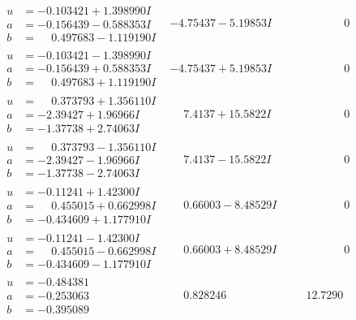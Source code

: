 \documentclass[1p]{elsarticle_modified}
\theoremstyle{definition}
\begin{document}
$$\begin{array}{c|c|c}
\begin{aligned}
u &= -0.103421 + 1.398990 I \\
a &= -0.156439 - 0.588353 I \\
b &= \phantom{-}0.497683 - 1.119190 I\end{aligned}
 & -4.75437 - 5.19853 I & \phantom{-0.000000 } 0 \\ \hline\begin{aligned}
u &= -0.103421 - 1.398990 I \\
a &= -0.156439 + 0.588353 I \\
b &= \phantom{-}0.497683 + 1.119190 I\end{aligned}
 & -4.75437 + 5.19853 I & \phantom{-0.000000 } 0 \\ \hline\begin{aligned}
u &= \phantom{-}0.373793 + 1.356110 I \\
a &= -2.39427 + 1.96966 I \\
b &= -1.37738 + 2.74063 I\end{aligned}
 & \phantom{-}7.4137 + 15.5822 I & \phantom{-0.000000 } 0 \\ \hline\begin{aligned}
u &= \phantom{-}0.373793 - 1.356110 I \\
a &= -2.39427 - 1.96966 I \\
b &= -1.37738 - 2.74063 I\end{aligned}
 & \phantom{-}7.4137 - 15.5822 I & \phantom{-0.000000 } 0 \\ \hline\begin{aligned}
u &= -0.11241 + 1.42300 I \\
a &= \phantom{-}0.455015 + 0.662998 I \\
b &= -0.434609 + 1.177910 I\end{aligned}
 & \phantom{-}0.66003 - 8.48529 I & \phantom{-0.000000 } 0 \\ \hline\begin{aligned}
u &= -0.11241 - 1.42300 I \\
a &= \phantom{-}0.455015 - 0.662998 I \\
b &= -0.434609 - 1.177910 I\end{aligned}
 & \phantom{-}0.66003 + 8.48529 I & \phantom{-0.000000 } 0 \\ \hline\begin{aligned}
u &= -0.484381\phantom{ +0.000000I} \\
a &= -0.253063\phantom{ +0.000000I} \\
b &= -0.395089\phantom{ +0.000000I}\end{aligned}
 & \phantom{-}0.828246\phantom{ +0.000000I} & \phantom{-}12.7290\phantom{ +0.000000I} \\ \hline\begin{aligned}

\end{aligned}
\end{array}$$
\end{document}
